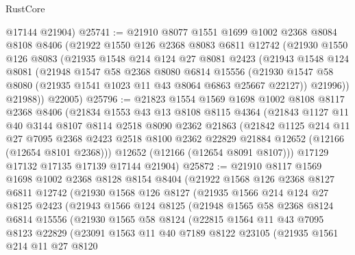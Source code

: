 \begin{lexlean}{RustCore}
\begin{coremodule}
      @17144
      @21904)
@25741 := @21910
    @8077
    @1551
    @1699
    @1002
    @2368
    @8084
    @8108
    @8406
    (@21922
      @1550
      @126
      @2368
      @8083
      @6811
      @12742
      (@21930
        @1550
        @126
        @8083
        (@21935
          @1548
          @214
          @124
          @27
          @8081
          @2423
          (@21943
            @1548
            @124
            @8081
            (@21948
              @1547
              @58
              @2368
              @8080
              @6814
              @15556
              (@21930 @1547 @58 @8080 (@21935 @1541 @1023 @11 @43 @8064 @6863 @25667 @22127))
              @21996))
          @21988))
      @22005)
@25796 := @21823
    @1554
    @1569
    @1698
    @1002
    @8108
    @8117
    @2368
    @8406
    (@21834
      @1553
      @43
      @13
      @8108
      @8115
      @4364
      (@21843
        @1127
        @11
        @40
        @3144
        @8107
        @8114
        @2518
        @8090
        @2362
        @21863
        (@21842
          @1125
          @214
          @11
          @27
          @7095
          @2368
          @2423
          @2518
          @8100
          @2362
          @22829
          @21884
          @12652
          (@12166 (@12654 @8101 @2368)))
        @12652
        (@12166 (@12654 @8091 @8107)))
      @17129
      @17132
      @17135
      @17139
      @17144
      @21904)
@25872 := @21910
    @8117
    @1569
    @1698
    @1002
    @2368
    @8128
    @8154
    @8404
    (@21922
      @1568
      @126
      @2368
      @8127
      @6811
      @12742
      (@21930
        @1568
        @126
        @8127
        (@21935
          @1566
          @214
          @124
          @27
          @8125
          @2423
          (@21943
            @1566
            @124
            @8125
            (@21948
              @1565
              @58
              @2368
              @8124
              @6814
              @15556
              (@21930
                @1565
                @58
                @8124
                (@22815
                  @1564
                  @11
                  @43
                  @7095
                  @8123
                  @22829
                  (@23091
                    @1563
                    @11
                    @40
                    @7189
                    @8122
                    @23105
                    (@21935
                      @1561
                      @214
                      @11
                      @27
                      @8120

\end{coremodule}
\end{lexlean}
